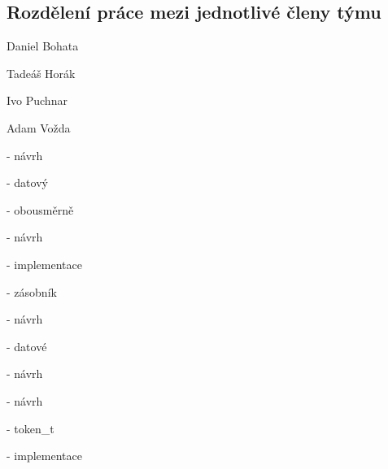 \documentclass[a4paper, 12pt]{article}
\begin{document}
\subsection{Rozdělení práce mezi jednotlivé členy týmu}
\begin{itemize}
    \begin{minipage}{0.25\linewidth}   
        \item Daniel Bohata
        \item[]\item[]\item[]
        \item Tadeáš Horák
        \item[]\item[]\item[]
        \item Ivo Puchnar
        \item[]\item[]\item[]
        \item Adam Vožda
        \item[]\item[]\item[]
        \vspace{0.25cm}
    \end{minipage}
    \begin{minipage}{0.7\linewidth}
        \item[-] návrh
        \item[-] datový
        \item[-] obousměrně
        \item[]
        
        \item[-] návrh
        \item[-] implementace
        \item[-] zásobník
        \item[]
        
        \item[-] návrh
        \item[-] datové
        \item[-] návrh
        \item[]
        
        \item[-] návrh
        \item[-] token\_t
        \item[-] implementace 
    \end{minipage}
\end{itemize}
\end{document}
